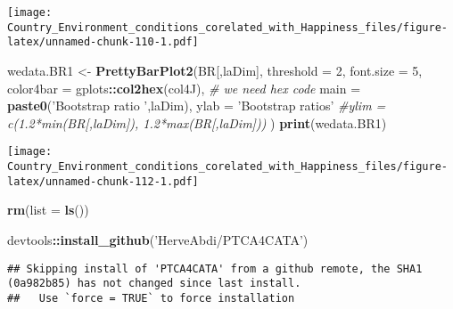 \documentclass[]{book}
\newenvironment{Shaded}{\begin{snugshade}}{\end{snugshade}}
\newcommand{\CommentTok}[1]{\textcolor[rgb]{0.56,0.35,0.01}{\textit{#1}}}
\newcommand{\DataTypeTok}[1]{\textcolor[rgb]{0.13,0.29,0.53}{#1}}
\newcommand{\DecValTok}[1]{\textcolor[rgb]{0.00,0.00,0.81}{#1}}
\newcommand{\KeywordTok}[1]{\textcolor[rgb]{0.13,0.29,0.53}{\textbf{#1}}}
\newcommand{\NormalTok}[1]{#1}
\newcommand{\OperatorTok}[1]{\textcolor[rgb]{0.81,0.36,0.00}{\textbf{#1}}}
\newcommand{\StringTok}[1]{\textcolor[rgb]{0.31,0.60,0.02}{#1}}
\begin{document}
\texttt{[image: Country\_Environment\_conditions\_corelated\_with\_Happiness\_files/figure-latex/unnamed-chunk-110-1.pdf]}

\begin{Shaded}
\begin{Highlighting}[]
\NormalTok{wedata.BR1 <-}\StringTok{ }\KeywordTok{PrettyBarPlot2}\NormalTok{(BR[,laDim],}
                          \DataTypeTok{threshold =} \DecValTok{2}\NormalTok{,}
                          \DataTypeTok{font.size =} \DecValTok{5}\NormalTok{,}
                          \DataTypeTok{color4bar =}\NormalTok{ gplots}\OperatorTok{::}\KeywordTok{col2hex}\NormalTok{(col4J), }\CommentTok{# we need hex code}
                          \DataTypeTok{main =} \KeywordTok{paste0}\NormalTok{(}\StringTok{'Bootstrap ratio '}\NormalTok{,laDim),}
                          \DataTypeTok{ylab =} \StringTok{'Bootstrap ratios'}
                          \CommentTok{#ylim = c(1.2*min(BR[,laDim]), 1.2*max(BR[,laDim]))}
\NormalTok{)}
\KeywordTok{print}\NormalTok{(wedata.BR1)}
\end{Highlighting}
\end{Shaded}

\texttt{[image: Country\_Environment\_conditions\_corelated\_with\_Happiness\_files/figure-latex/unnamed-chunk-112-1.pdf]}

\begin{Shaded}
\begin{Highlighting}[]
\KeywordTok{rm}\NormalTok{(}\DataTypeTok{list =} \KeywordTok{ls}\NormalTok{())}

\NormalTok{devtools}\OperatorTok{::}\KeywordTok{install_github}\NormalTok{(}\StringTok{'HerveAbdi/PTCA4CATA'}\NormalTok{)}
\end{Highlighting}
\end{Shaded}

\begin{verbatim}
## Skipping install of 'PTCA4CATA' from a github remote, the SHA1 (0a982b85) has not changed since last install.
##   Use `force = TRUE` to force installation
\end{verbatim}
\end{document}
